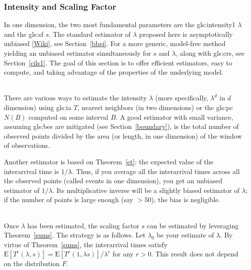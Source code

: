 \documentclass[10pt]{article}
\begin{document}
\subsubsection{Intensity and Scaling Factor}\label{estim1}

In one dimension, the two most fundamental parameters are the \gls{gls:intensity1} $\lambda$ and the \gls{gls:sf} $s$.
The standard estimator of $\lambda$ proposed here is asymptotically unbiased [\href{https://en.wikipedia.org/wiki/Consistent_estimator}{Wiki}],
 see Section~\ref{bbei}. For a more generic, model-free method yielding an unbiased estimator simultaneously for $s$ and $\lambda$, along with \glspl{gls:cr},
see Section~\ref{cils1}. The goal of this section is to offer efficient estimators, easy to compute, and taking advantage of the properties of the underlying model. \\
\quad \\
\label{lambda1865}

\noindent There are various ways to estimate the intensity $\lambda$ (more specifically, $\lambda^d$ in $d$ dimension)
using \gls{gls:ia} $T$, \textcolor{index}{nearest neighbors} (in two dimensions) or the \gls{gls:pc} $N(B)$ computed on some interval $B$. A good estimator with small variance, assuming \glspl{gls:be} are mitigated (see Section~\ref{boundary}), is the total number of observed points divided by the area (or length, in one dimension) of the window of observations.

Another estimator is based on Theorem~\ref{et}: the expected value of the interarrival time is $1/\lambda$. Thus, if you average all the interarrival times across all the
observed points (called events in one dimension), you get an unbiased estimator of $1/\lambda$. Its multiplicative inverse will be a slightly biased estimator of $\lambda$; if
the number of points is large enough (say $> 50$), the bias is negligible. \\
\quad \\

\noindent Once $\lambda$ has been estimated, the scaling factor $s$ can be estimated by leveraging Theorem~\ref{sums}. The strategy is as follows. Let $\lambda_0$ be your estimate of $\lambda$. By virtue of Theorem~\ref{sums}, the interarrival times satisfy $\mbox{E}[T^r(\lambda, s)] = \mbox{E}[T^r(1, \lambda s)] / \lambda^r$ for any $r>0$.  This result does not depend on the distribution $F$.
\end{document}
